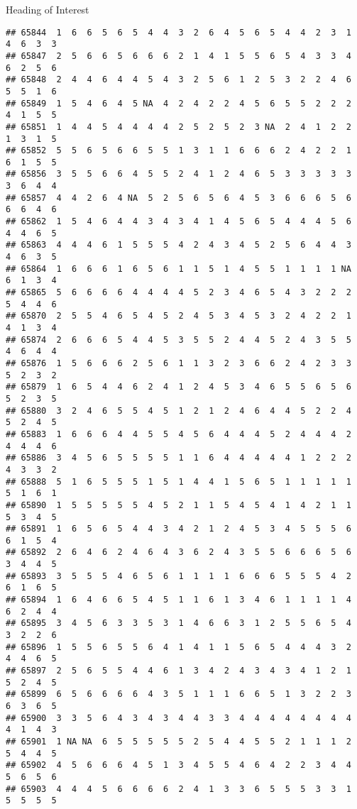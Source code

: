 \documentclass[
  ignorenonframetext,
]{beamer}
\begin{document}
\begin{frame}[fragile]{Heading of Interest}
\begin{verbatim}
## 65844  1  6  6  5  6  5  4  4  3  2  6  4  5  6  5  4  4  2  3  1  4  6  3  3
## 65847  2  5  6  6  5  6  6  6  2  1  4  1  5  5  6  5  4  3  3  4  6  2  5  6
## 65848  2  4  4  6  4  4  5  4  3  2  5  6  1  2  5  3  2  2  4  6  5  5  1  6
## 65849  1  5  4  6  4  5 NA  4  2  4  2  2  4  5  6  5  5  2  2  2  4  1  5  5
## 65851  1  4  4  5  4  4  4  4  2  5  2  5  2  3 NA  2  4  1  2  2  1  3  1  5
## 65852  5  5  6  5  6  6  5  5  1  3  1  1  6  6  6  2  4  2  2  1  6  1  5  5
## 65856  3  5  5  6  6  4  5  5  2  4  1  2  4  6  5  3  3  3  3  3  3  6  4  4
## 65857  4  4  2  6  4 NA  5  2  5  6  5  6  4  5  3  6  6  6  5  6  6  6  4  6
## 65862  1  5  4  6  4  4  3  4  3  4  1  4  5  6  5  4  4  4  5  6  4  4  6  5
## 65863  4  4  4  6  1  5  5  5  4  2  4  3  4  5  2  5  6  4  4  3  4  6  3  5
## 65864  1  6  6  6  1  6  5  6  1  1  5  1  4  5  5  1  1  1  1 NA  6  1  3  4
## 65865  5  6  6  6  6  4  4  4  4  5  2  3  4  6  5  4  3  2  2  2  5  4  4  6
## 65870  2  5  5  4  6  5  4  5  2  4  5  3  4  5  3  2  4  2  2  1  4  1  3  4
## 65874  2  6  6  6  5  4  4  5  3  5  5  2  4  4  5  2  4  3  5  5  4  6  4  4
## 65876  1  5  6  6  6  2  5  6  1  1  3  2  3  6  6  2  4  2  3  3  5  2  3  2
## 65879  1  6  5  4  4  6  2  4  1  2  4  5  3  4  6  5  5  6  5  6  5  2  3  5
## 65880  3  2  4  6  5  5  4  5  1  2  1  2  4  6  4  4  5  2  2  4  5  2  4  5
## 65883  1  6  6  6  4  4  5  5  4  5  6  4  4  4  5  2  4  4  4  2  4  4  4  6
## 65886  3  4  5  6  5  5  5  5  1  1  6  4  4  4  4  4  1  2  2  2  4  3  3  2
## 65888  5  1  6  5  5  5  1  5  1  4  4  1  5  6  5  1  1  1  1  1  5  1  6  1
## 65890  1  5  5  5  5  5  4  5  2  1  1  5  4  5  4  1  4  2  1  1  5  3  4  5
## 65891  1  6  5  6  5  4  4  3  4  2  1  2  4  5  3  4  5  5  5  6  6  1  5  4
## 65892  2  6  4  6  2  4  6  4  3  6  2  4  3  5  5  6  6  6  5  6  3  4  4  5
## 65893  3  5  5  5  4  6  5  6  1  1  1  1  6  6  6  5  5  5  4  2  6  1  6  5
## 65894  1  6  4  6  6  5  4  5  1  1  6  1  3  4  6  1  1  1  1  4  6  2  4  4
## 65895  3  4  5  6  3  3  5  3  1  4  6  6  3  1  2  5  5  6  5  4  3  2  2  6
## 65896  1  5  5  6  5  5  6  4  1  4  1  1  5  6  5  4  4  4  3  2  4  4  6  5
## 65897  2  5  6  5  5  4  4  6  1  3  4  2  4  3  4  3  4  1  2  1  5  2  4  5
## 65899  6  5  6  6  6  6  4  3  5  1  1  1  6  6  5  1  3  2  2  3  6  3  6  5
## 65900  3  3  5  6  4  3  4  3  4  4  3  3  4  4  4  4  4  4  4  4  4  1  4  3
## 65901  1 NA NA  6  5  5  5  5  5  2  5  4  4  5  5  2  1  1  1  2  5  4  4  5
## 65902  4  5  6  6  6  4  5  1  3  4  5  5  4  6  4  2  2  3  4  4  5  6  5  6
## 65903  4  4  4  5  6  6  6  6  2  4  1  3  3  6  5  5  5  3  3  1  5  5  5  5

\end{verbatim}
\end{frame}
\end{document}

